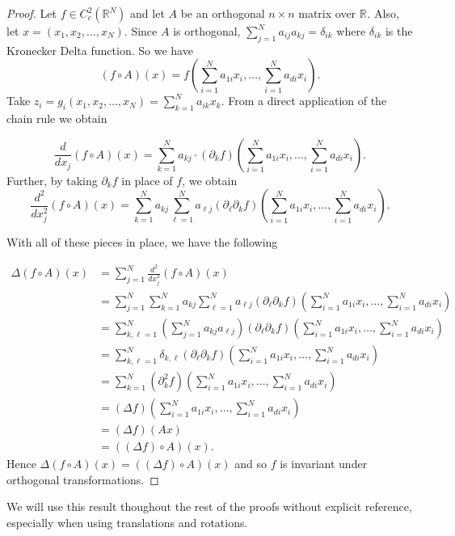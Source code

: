 \documentclass[12pt]{report}
\numberwithin{definition}{section}
\begin{document}
\begin{proof}
  Let $f \in C_{c}^2(\mathbb{R}^{N} )$ and let $A$ be an orthogonal $n \times n$ matrix over $\mathbb{R}^{} $.
  Also, let $x = (x_1,x_2,\ldots,x_{N})$.
  Since $A$ is orthogonal, $\sum_{j=1}^N a_{ij}a_{kj} = \delta_{ik}$ where $\delta_{ik}$ is the Kronecker Delta function.
  So we have
  \[
    (f \circ A)(x) = f \left( \sum_{i=1}^{N} a_{1i}x_{i}, \ldots , \sum_{i=1}^{N} a_{di}x_{i} \right )
  .\] 
  Take $z_{i} = g_{i}(x_1,x_2,\ldots,x_{N}) = \sum_{k=1}^{N} a_{ik}x_{k}$.
  From a direct application of the chain rule we obtain

  \[
    \frac{d}{dx_j} (f\circ A)(x) = \sum_{k=1}^N a_{kj} \cdot (\partial_k f)( \sum_{i=1}^N a_{1i} x_i, \dots, \sum_{i=1}^N a_{di} x_i ) 
  .\] 
  Further, by taking $\partial_{k} f$ in place of $f$, we obtain
  \[
  \frac{d^2}{dx_j^2} (f\circ A)(x) = \sum_{k=1}^N a_{kj} \sum_{\ell=1}^N a_{\ell j} (\partial_\ell \partial_k f)( \sum_{i=1}^N a_{1i} x_i, \dots, \sum_{i=1}^N a_{di} x_i )
  .\] 

  With all of these pieces in place, we have the following

\begin{align*}
  \Delta (f\circ A)(x) &= \sum_{j=1}^N \frac{d^2}{dx_j^2} (f\circ A)(x) \\
  &= \sum_{j=1}^N \sum_{k=1}^N a_{kj} \sum_{\ell=1}^N a_{\ell j} (\partial_\ell \partial_k f)( \sum_{i=1}^N a_{1i} x_i, \dots, \sum_{i=1}^N a_{di} x_i ) \\
  &= \sum_{k,\ell=1}^N \left( \sum_{j=1}^N a_{kj} a_{\ell j} \right) (\partial_\ell \partial_k f)( \sum_{i=1}^N a_{1i} x_i, \dots, \sum_{i=1}^N a_{di} x_i ) \\
  &= \sum_{k,\ell=1}^N \delta_{k,\ell} (\partial_\ell \partial_k f)( \sum_{i=1}^N a_{1i} x_i, \dots, \sum_{i=1}^N a_{di} x_i ) \\
  &= \sum_{k=1}^N (\partial_k^2 f)( \sum_{i=1}^N a_{1i} x_i, \dots, \sum_{i=1}^N a_{di} x_i ) \\
  &= (\Delta f) ( \sum_{i=1}^N a_{1i} x_i, \dots, \sum_{i=1}^N a_{di} x_i ) \\
  &= (\Delta f)(Ax) \\
  &= ((\Delta f)\circ A)(x).
\end{align*}
  Hence $\Delta (f\circ A)(x) = ((\Delta f)\circ A)(x)$ and so $f$ is invariant under orthogonal transformations.
  
\end{proof}

We will use this result thoughout the rest of the proofs without explicit reference, especially when using translations and rotations.
\end{document}
